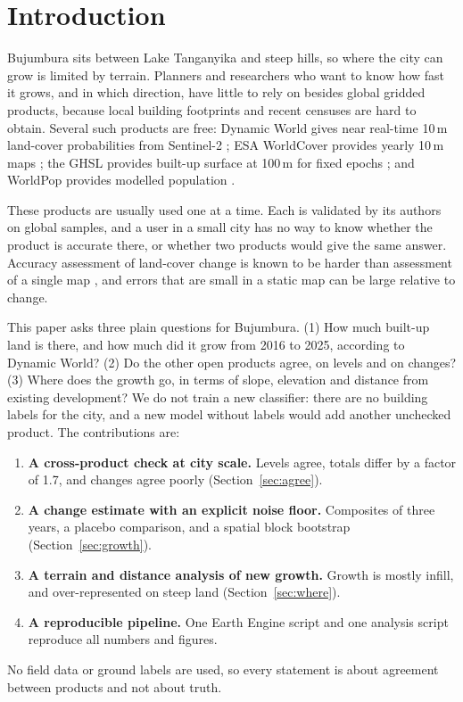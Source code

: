 \documentclass[conference]{IEEEtran}
\begin{document}
\section{Introduction}

Bujumbura sits between Lake Tanganyika and steep hills, so where the city can grow is limited by terrain. Planners and researchers who want to know how fast it grows, and in which direction, have little to rely on besides global gridded products, because local building footprints and recent censuses are hard to obtain. Several such products are free: Dynamic World gives near real-time 10\,m land-cover probabilities from Sentinel-2 \cite{brown2022dw}; ESA WorldCover provides yearly 10\,m maps \cite{zanaga2021wc,zanaga2022wc}; the GHSL provides built-up surface at 100\,m for fixed epochs \cite{pesaresi2023ghsl}; and WorldPop provides modelled population \cite{tatem2017worldpop}.

These products are usually used one at a time. Each is validated by its authors on global samples, and a user in a small city has no way to know whether the product is accurate there, or whether two products would give the same answer. Accuracy assessment of land-cover change is known to be harder than assessment of a single map \cite{olofsson2014good,stehman2019key}, and errors that are small in a static map can be large relative to change.

This paper asks three plain questions for Bujumbura. (1) How much built-up land is there, and how much did it grow from 2016 to 2025, according to Dynamic World? (2) Do the other open products agree, on levels and on changes? (3) Where does the growth go, in terms of slope, elevation and distance from existing development? We do not train a new classifier: there are no building labels for the city, and a new model without labels would add another unchecked product. The contributions are:
\begin{enumerate}
\item \textbf{A cross-product check at city scale.} Levels agree, totals differ by a factor of 1.7, and changes agree poorly (Section~\ref{sec:agree}).
\item \textbf{A change estimate with an explicit noise floor.} Composites of three years, a placebo comparison, and a spatial block bootstrap (Section~\ref{sec:growth}).
\item \textbf{A terrain and distance analysis of new growth.} Growth is mostly infill, and over-represented on steep land (Section~\ref{sec:where}).
\item \textbf{A reproducible pipeline.} One Earth Engine script and one analysis script reproduce all numbers and figures.
\end{enumerate}
No field data or ground labels are used, so every statement is about agreement between products and not about truth.
\end{document}
